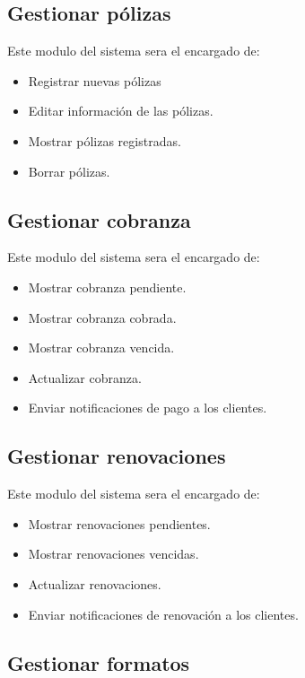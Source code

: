 \subsection*{Gestionar pólizas}

Este modulo del sistema sera el encargado de:
\begin{itemize}
	\item Registrar nuevas pólizas
	\item Editar información de las pólizas.
	\item Mostrar pólizas registradas.
	\item Borrar pólizas.
\end{itemize}

\subsection*{Gestionar cobranza}

Este modulo del sistema sera el encargado de:
\begin{itemize}
	\item Mostrar cobranza pendiente.
	\item Mostrar cobranza cobrada.
	\item Mostrar cobranza vencida.
	\item Actualizar cobranza.
	\item Enviar notificaciones de pago a los clientes.
\end{itemize}

\subsection*{Gestionar renovaciones}

Este modulo del sistema sera el encargado de:
\begin{itemize}
	\item Mostrar renovaciones pendientes.
	\item Mostrar renovaciones vencidas.
	\item Actualizar renovaciones.
	\item Enviar notificaciones de renovación a los clientes.
\end{itemize}

\subsection*{Gestionar formatos}


